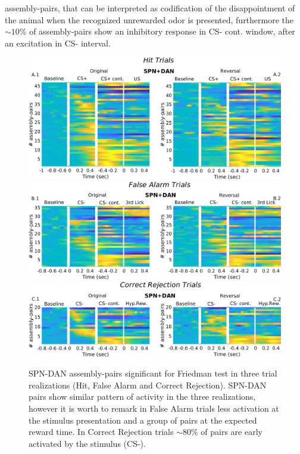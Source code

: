 assembly-pairs, that can be interpreted as codification of the disappointment of the animal when the recognized unrewarded odor is presented, furthermore the $\sim10\%$ of assembly-pairs show an inhibitory response in CS- cont. window, after an excitation in CS- interval.
\begin{figure}
\centering
\includegraphics[scale=0.36]{figures/HeatSPN_DANHit.png}
\includegraphics[scale=0.36]{figures/HeatFA_SPN_DAN1.png}
\includegraphics[scale=0.36]{figures/HeatCR_SPN_DAN1.png}
\caption{SPN-DAN assembly-pairs significant for Friedman test in three trial realizations (Hit, False Alarm and Correct Rejection). SPN-DAN pairs show similar pattern of activity in the three realizations, however it is worth to remark in False Alarm trials less activation at the stimulus presentation and a group of pairs at the expected reward time. In Correct Rejection trials $\sim 80\%$ of pairs are early activated by the stimulus (CS-).}
\label{fig:HeatSPN_DANComp}
\end{figure}
